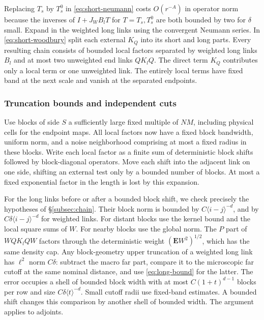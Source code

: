 \documentclass[11pt]{article}
\begin{document}
Replacing \(T_s\) by \(T_s^0\) in \eqref{eq:short-neumann} costs \(O(r^{-A})\) in operator norm because the inverses of \(I+J_W B_l T\) for \(T=T_s,T_s^0\) are both bounded by two for \(\delta\) small. Expand in the weighted long links using the convergent Neumann series. In \eqref{eq:short-woodbury} split each external \(K_Q\) into its short and long parts. Every resulting chain consists of bounded local factors separated by weighted long links \(B_l\) and at most two unweighted end links \(QK_lQ\). The direct term \(K_Q\) contributes only a local term or one unweighted link. The entirely local terms have fixed band at the next scale and vanish at the separated endpoints.

\subsubsection{Truncation bounds and independent cuts}\label{truncation-bounds-and-independent-cuts}

Use blocks of side \(S\) a sufficiently large fixed multiple of \(NM\), including physical cells for the endpoint maps. All local factors now have a fixed block bandwidth, uniform norm, and a noise neighborhood comprising at most a fixed radius in these blocks. Write each local factor as a finite sum of deterministic block shifts followed by block-diagonal operators. Move each shift into the adjacent link on one side, shifting an external test only by a bounded number of blocks. At most a fixed exponential factor in the length is lost by this expansion.

For the long links before or after a bounded block shift, we check precisely the hypotheses of \S\ref{subsec:chain}. Their block norm is bounded by \(C\langle i-j\rangle^{-d}\), and by \(C\delta\langle i-j\rangle^{-d}\) for weighted links. For distant blocks use the kernel bound and the local square sums of \(W\). For nearby blocks use the global norm. The \(P\) part of \(WQ K_l QW\) factors through the deterministic weight \((\mathbf E W^2)^{1/2}\), which has the same density cap. Any block-geometry upper truncation of a weighted long link has \(\ell^2\) norm \(C\delta\): subtract the macro far part, compare it to the microscopic far cutoff at the same nominal distance, and use \eqref{eq:long-bound} for the latter. The error occupies a shell of bounded block width with at most \(C(1+t)^{d-1}\) blocks per row and size \(C\delta\langle t\rangle^{-d}\). Small cutoff radii use fixed-band estimates. A bounded shift changes this comparison by another shell of bounded width. The argument applies to adjoints.
\end{document}
